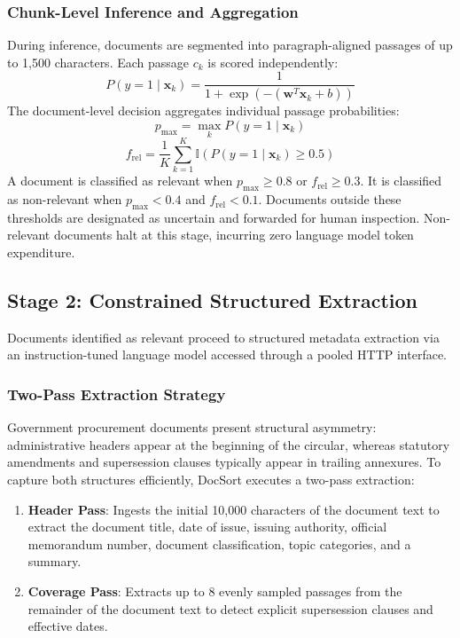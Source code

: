 \documentclass[conference]{IEEEtran}
\begin{document}
\subsubsection{Chunk-Level Inference and Aggregation}
During inference, documents are segmented into paragraph-aligned passages of up to 1,500 characters. Each passage $c_k$ is scored independently:
\begin{equation}
    P(y = 1 \mid \mathbf{x}_k) = \frac{1}{1 + \exp(-(\mathbf{w}^T \mathbf{x}_k + b))}
\end{equation}
The document-level decision aggregates individual passage probabilities:
\begin{equation}
    p_{\max} = \max_k P(y = 1 \mid \mathbf{x}_k)
\end{equation}
\begin{equation}
    f_{\text{rel}} = \frac{1}{K} \sum_{k=1}^{K} \mathbb{I}(P(y = 1 \mid \mathbf{x}_k) \ge 0.5)
\end{equation}
A document is classified as relevant when $p_{\max} \ge 0.8$ or $f_{\text{rel}} \ge 0.3$. It is classified as non-relevant when $p_{\max} < 0.4$ and $f_{\text{rel}} < 0.1$. Documents outside these thresholds are designated as uncertain and forwarded for human inspection. Non-relevant documents halt at this stage, incurring zero language model token expenditure.

\subsection{Stage 2: Constrained Structured Extraction}
Documents identified as relevant proceed to structured metadata extraction via an instruction-tuned language model accessed through a pooled HTTP interface.

\subsubsection{Two-Pass Extraction Strategy}
Government procurement documents present structural asymmetry: administrative headers appear at the beginning of the circular, whereas statutory amendments and supersession clauses typically appear in trailing annexures. To capture both structures efficiently, DocSort executes a two-pass extraction:
\begin{enumerate}
    \item \textbf{Header Pass}: Ingests the initial 10,000 characters of the document text to extract the document title, date of issue, issuing authority, official memorandum number, document classification, topic categories, and a summary.
    \item \textbf{Coverage Pass}: Extracts up to 8 evenly sampled passages from the remainder of the document text to detect explicit supersession clauses and effective dates.
\end{enumerate}
\end{document}
